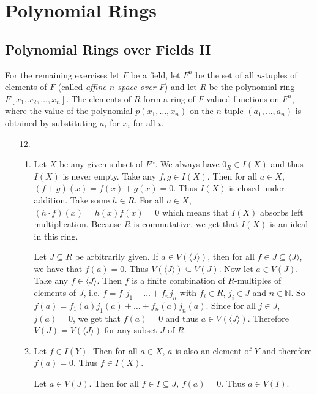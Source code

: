 \chapter{Polynomial Rings}

\section{Polynomial Rings over Fields II}

For the remaining exercises let $F$ be a field, let $F^n$ be the set of all $n$-tuples of elements of $F$ (called \textit{affine $n$-space over F}) and let $R$ be the polynomial ring $F[x_1,x_2,\dots,x_n]$. The elements of $R$ form a ring of $F$-valued functions on $F^n$, where the value of the polynomial $p(x_1,\dots,x_n)$ on the $n$-tuple $(a_1,\dots,a_n)$ is obtained by substituting $a_i$ for $x_i$ for all $i$.

\begin{enumerate}
\item[12.]
\begin{enumerate}
\item
Let $X$ be any given subset of $F^n$. We always have $0_R\in I(X)$ and thus $I(X)$ is never empty. Take any $f,g\in I(X)$. Then for all $a\in X$, $(f+g)(x) = f(x)+g(x)=0$. Thus $I(X)$ is closed under addition. Take some $h\in R$. For all $a\in X$, $(h\cdot f)(x)=h(x)f(x)=0$ which means that $I(X)$ absorbs left multiplication. Because $R$ is commutative, we get that $I(X)$ is an ideal in this ring.

Let $J\subseteq R$ be arbitrarily given. If $a\in V(\langle J\rangle)$, then for all $f\in J\subseteq \langle J\rangle$, we have that $f(a)=0$. Thus $V(\langle J\rangle)\subseteq V(J)$. Now let $a\in V(J)$. Take any $f\in \langle J\rangle$. Then $f$ is a finite combination of $R$-multiples of elements of $J$, i.e. $f=f_1j_1+\dots+f_nj_n$ with $f_i\in R$, $j_i\in J$ and $n\in \mathbb{N}$. So $f(a) = f_1(a)j_1(a)+\dots+f_n(a)j_n(a)$. Since for all $j\in J$, $j(a)=0$, we get that $f(a)=0$ and thus $a\in V(\langle J\rangle)$. Therefore $V(J)=V(\langle J\rangle)$ for any subset $J$ of $R$.

\item
Let $f\in I(Y)$. Then for all $a\in X$, $a$ is also an element of $Y$ and therefore $f(a)=0$. Thus $f\in I(X)$.

Let $a\in V(J)$. Then for all $f\in I\subseteq J$, $f(a)=0$. Thus $a\in V(I)$.
\end{enumerate}
\end{enumerate}
